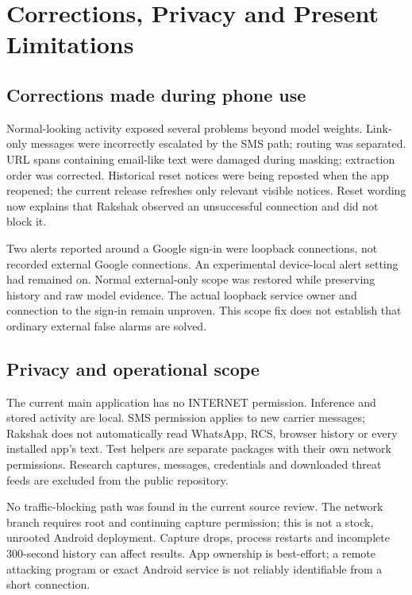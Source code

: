 \documentclass[11pt,a4paper]{article}
\newcommand{\chapterpage}[1]{\clearpage\section{#1}}
\begin{document}
\chapterpage{Corrections, Privacy and Present Limitations}
\subsection*{Corrections made during phone use}
Normal-looking activity exposed several problems beyond model weights. Link-only
messages were incorrectly escalated by the SMS path; routing was separated. URL spans
containing email-like text were damaged during masking; extraction order was corrected.
Historical reset notices were being reposted when the app reopened; the current release
refreshes only relevant visible notices. Reset wording now explains that Rakshak observed
an unsuccessful connection and did not block it.

Two alerts reported around a Google sign-in were loopback connections, not recorded
external Google connections. An experimental device-local alert setting had remained on.
Normal external-only scope was restored while preserving history and raw model evidence.
The actual loopback service owner and connection to the sign-in remain unproven.
This scope fix does not establish that ordinary external false alarms are solved.

\subsection*{Privacy and operational scope}
The current main application has no INTERNET permission. Inference and stored activity
are local. SMS permission applies to new carrier messages; Rakshak does not automatically
read WhatsApp, RCS, browser history or every installed app's text. Test helpers are
separate packages with their own network permissions. Research captures, messages,
credentials and downloaded threat feeds are excluded from the public repository.

No traffic-blocking path was found in the current source review. The network branch
requires root and continuing capture permission; this is not a stock, unrooted Android
deployment. Capture drops, process restarts and incomplete 300-second history can affect
results. App ownership is best-effort; a remote attacking program or exact Android
service is not reliably identifiable from a short connection.
\end{document}
